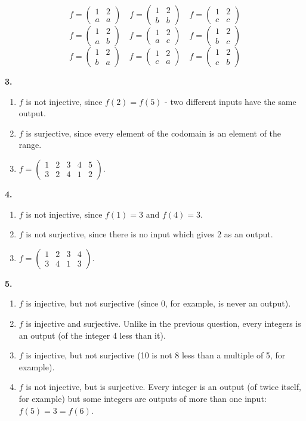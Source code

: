 \documentclass[10pt,]{book}
\theoremstyle{plain}
\theoremstyle{definition}
\theoremstyle{definition}
\theoremstyle{definition}
\numberwithin{equation}{chapter}
\newcommand{\twoline}[2]{\begin{pmatrix}#1 \\ #2 \end{pmatrix}}
\newcommand{\amp}{ & }
\begin{document}
            \begin{equation*}
              f = \twoline{1 \amp 2}{a\amp a} \quad f = \twoline{1 \amp 2}{b \amp b} \quad f = \twoline{1 \amp 2}{c \amp c}
            \end{equation*}
             \begin{equation*}
               f = \twoline{1 \amp 2}{a\amp b} \quad f = \twoline{1 \amp 2}{a \amp c} \quad f = \twoline{1 \amp 2}{b \amp c}
             \end{equation*}
             \begin{equation*}
               f = \twoline{1 \amp 2}{b \amp a} \quad f = \twoline{1 \amp 2}{c \amp a} \quad f = \twoline{1 \amp 2}{c \amp b}
             \end{equation*}
\par\smallskip
\noindent\textbf{3.}\quad{}\leavevmode%
\begin{enumerate}[label=(\alph*)]
\item\hypertarget{li-304}{}\(f\) is not injective, since \(f(2) = f(5)\) - two different inputs have the same output.%
\item\hypertarget{li-305}{}\(f\) is surjective, since every element of the codomain is an element of the range.%
\item\hypertarget{li-306}{}\(f=\begin{pmatrix}1 \amp 2 \amp 3 \amp 4 \amp 5 \\ 3 \amp 2 \amp 4 \amp 1 \amp 2\end{pmatrix}\).%
\end{enumerate}
\par\smallskip
\noindent\textbf{4.}\quad{}\leavevmode%
\begin{enumerate}[label=(\alph*)]
\item\hypertarget{li-310}{}\(f\) is not injective, since \(f(1) = 3\) and \(f(4) = 3\).%
\item\hypertarget{li-311}{}\(f\) is not surjective, since there is no input which gives 2 as an output.%
\item\hypertarget{li-312}{}\(f=\begin{pmatrix} 1 \amp 2 \amp 3 \amp 4 \\ 3 \amp 4 \amp 1 \amp 3\end{pmatrix}\).%
\end{enumerate}
\par\smallskip
\noindent\textbf{5.}\quad{}\leavevmode%
\begin{enumerate}[label=(\alph*)]
\item\hypertarget{li-317}{}\(f\) is injective, but not surjective (since 0, for example, is never an output).%
\item\hypertarget{li-318}{}\(f\) is injective and surjective. Unlike in the previous question, every integers is an output (of the integer 4 less than it).%
\item\hypertarget{li-319}{}\(f\) is injective, but not surjective (10 is not 8 less than a multiple of 5, for example).%
\item\hypertarget{li-320}{}\(f\) is not injective, but is surjective. Every integer is an output (of twice itself, for example) but some integers are outputs of more than one input: \(f(5) = 3 = f(6)\).%
\end{enumerate}
\end{document}
